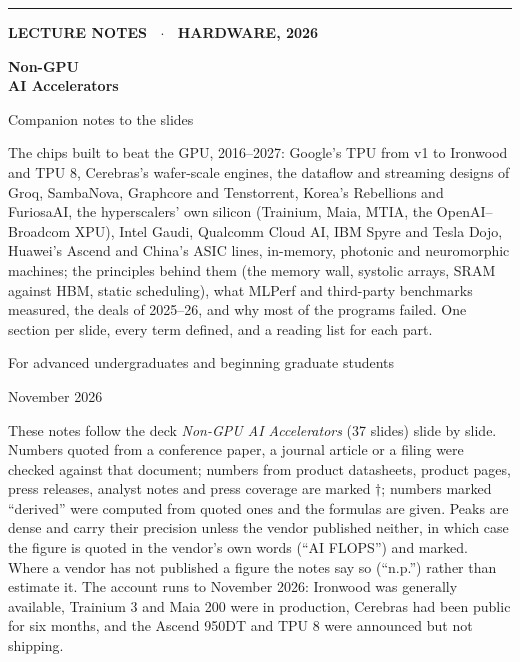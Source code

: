 \documentclass[11pt,letterpaper]{article}
\begin{document}
\begin{titlepage}
\thispagestyle{empty}
\vspace*{2.5cm}
{\color{attn}\rule{3cm}{3pt}}\par\vspace{0.6cm}
{\sffamily\bfseries\color{muted}\large LECTURE NOTES \ $\cdot$ \ HARDWARE, 2026\par}
\vspace{0.4cm}
{\sffamily\bfseries\fontsize{30}{34}\selectfont\color{ink} Non-GPU\\AI Accelerators\par}
\vspace{0.3cm}
{\sffamily\fontsize{18}{22}\selectfont\color{ink} Companion notes to the slides\par}
\vspace{1.2cm}
{\large\color{muted}\parbox{0.82\textwidth}{The chips built to beat the GPU, 2016--2027: Google's TPU from v1 to Ironwood and TPU 8, Cerebras's wafer-scale engines, the dataflow and streaming designs of Groq, SambaNova, Graphcore and Tenstorrent, Korea's Rebellions and FuriosaAI, the hyperscalers' own silicon (Trainium, Maia, MTIA, the OpenAI--Broadcom XPU), Intel Gaudi, Qualcomm Cloud AI, IBM Spyre and Tesla Dojo, Huawei's Ascend and China's ASIC lines, in-memory, photonic and neuromorphic machines; the principles behind them (the memory wall, systolic arrays, SRAM against HBM, static scheduling), what MLPerf and third-party benchmarks measured, the deals of 2025--26, and why most of the programs failed. One section per slide, every term defined, and a reading list for each part.}\par}
\vspace{1.5cm}
{\color{muted}For advanced undergraduates and beginning graduate students\par}
\vspace{0.3cm}
{\color{muted}November 2026\par}
\vfill
{\small\color{muted}\parbox{0.9\textwidth}{These notes follow the deck \textit{Non-GPU AI Accelerators} (37 slides) slide by slide. Numbers quoted from a conference paper, a journal article or a filing were checked against that document; numbers from product datasheets, product pages, press releases, analyst notes and press coverage are marked $\dagger$; numbers marked ``derived'' were computed from quoted ones and the formulas are given. Peaks are dense and carry their precision unless the vendor published neither, in which case the figure is quoted in the vendor's own words (``AI FLOPS'') and marked. Where a vendor has not published a figure the notes say so (``n.p.'') rather than estimate it. The account runs to November 2026: Ironwood was generally available, Trainium 3 and Maia 200 were in production, Cerebras had been public for six months, and the Ascend 950DT and TPU 8 were announced but not shipping.}\par}
\end{titlepage}
\end{document}
